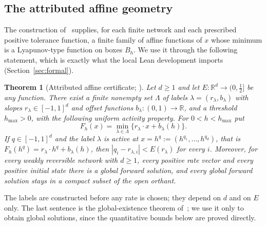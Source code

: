 \documentclass[11pt,a4paper]{article}
\theoremstyle{plain}
\newtheorem{theorem}{Theorem}[section]
\theoremstyle{definition}
\theoremstyle{remark}
\newcommand{\R}{\mathbb R}
\begin{document}
\subsection{The attributed affine geometry}
\label{sec:imported}
The construction of~\cite{OpenAI2026Uniform} supplies, for each finite network and each prescribed positive tolerance function, a finite family of affine functions of $x$ whose minimum is a Lyapunov-type function on boxes $B_h$. We use it through the following statement, which is exactly what the local Lean development imports (Section~\ref{sec:formal}).

\begin{theorem}[Attributed affine certificate; \cite{OpenAI2026Uniform,OpenAI2026Formal}]\label{thm:imported}
Let $d\ge1$ and let $E:\R^d\to(0,\tfrac12]$ be any function. There exist a finite nonempty set $\Lambda$ of labels $\lambda=(r_\lambda,b_\lambda)$ with slopes $r_\lambda\in[-1,1]^d$ and offset functions $b_\lambda:(0,1)\to\R$, and a threshold $h_{\max}>0$, with the following \emph{uniform activity} property. For $0<h<h_{\max}$ put
\[
 F_h(x)=\min_{\lambda\in\Lambda}\{r_\lambda\cdot x+b_\lambda(h)\}.
\]
If $q\in[-1,1]^d$ and the label $\lambda$ is active at $x=h^q:=(h^{q_1},\dots,h^{q_d})$, that is $F_h(h^q)=r_\lambda\cdot h^q+b_\lambda(h)$, then $|q_i-r_{\lambda,i}|<E(r_\lambda)$ for every $i$.
Moreover, for every weakly reversible network with $d\ge1$, every positive rate vector and every positive initial state there is a global forward solution, and every global forward solution stays in a compact subset of the open orthant.
\end{theorem}

The labels are constructed before any rate is chosen; they depend on $d$ and on $E$ only. The last sentence is the global-existence theorem of~\cite{OpenAI2026Boundedness,OpenAI2026Formal}; we use it only to obtain global solutions, since the quantitative bounds below are proved directly.
\end{document}
